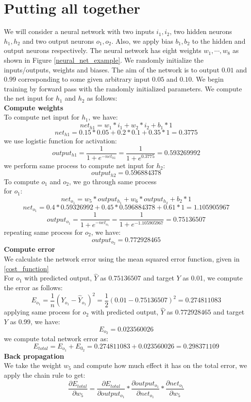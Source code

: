 \documentclass[master]{thesis-uestc}
\begin{document}
\section{Putting all together}
We will consider a neural network with two inputs $i_1, i_2$, two hidden neurons $h_1, h_2$ and two output neurons $o_1, o_2$. Also, we apply bias $b_1, b_2$ to the hidden and output neurons respectively. The neural network has eight weights $w_1, \cdots, w_8$ as shown in Figure \ref{neural_net_example}. We randomly initialize the inputs/outputs, weights and biases. The aim of the network is to output $0.01$ and $0.99$ corresponding to some given arbitrary input $0.05$ and $0.10$.
We begin training by forward pass with the randomly initialized parameters. We compute the net input for $h_1$ and $h_2$ as follows:\\
\textbf{Compute weights} \\
To compute net input for $h_1$, we have:
\[net_{h1} = w_1 * i_1 + w_2 * i_2 + b_1 * 1\]
\[net_{h1} = 0.15 * 0.05 + 0.2 * 0.1 + 0.35 * 1 = 0.3775\]
we use logistic function for activation:
\[output_{h1} = \frac{1}{1 + e^{-net_{h1}}} = \frac{1}{1 + e^{0.3775}} = 0.593269992\]
we perform same process to compute net input for $h_2$:
\[output_{h2} = 0.596884378\]
To compute $o_1$ and $o_2$, we go through same process\\
for $o_1$:
\[net_{o_1} = w_5 * output_{h_1} + w_6 * output_{h_2} + b_2 * 1\]
\[net_{o_1} = 0.4 * 0.59326992 + 0.45 * 0.596884378 + 0.61 * 1 = 1.105905967\]
\[output_{o_1} = \frac{1}{1 + e^{-net_{o_1}}} = \frac{1}{1 + e^{-1.105905967}} = 0.75136507\]
repeating same process for $o_2$, we have:
\[output_{o_2} = 0.772928465 \]
\textbf{Compute error} \\
We calculate the network error using the mean squared error function, given in \ref{cost_function}\\
For $o_1$ with predicted output, $\hat{Y}$ as $0.75136507$ and target $Y$ as 0.01, we compute the error as follows:
\[E_{o_1} = \frac{1}{n}(Y_{o_1} - \hat{Y}_{o_1})^2 = \frac{1}{2}(0.01 - 0.75136507)^2 = 0.274811083\]
applying same process for $o_2$ with predicted output, $\hat{Y}$ as $0.772928465$ and target $Y$ as 0.99, we have:
\[E_{o_2} = 0.023560026\]
we compute total network error as:
\[E_{total} = E_{o_1} + E_{0_2} = 0.274811083 + 0.023560026 = 0.298371109\]
\textbf{Back propagation} \\
We take the weight $w_5$ and compute how much effect it has on the total error, we apply the chain rule to get:
\[\frac{\partial E_{total}}{\partial w_5} = \frac{\partial E_{total}}{\partial output_{o_1}} * \frac{\partial output_{o_1}}{\partial net_{o_1}} * \frac{\partial net_{o_1}}{\partial w_5}\]
\end{document}
